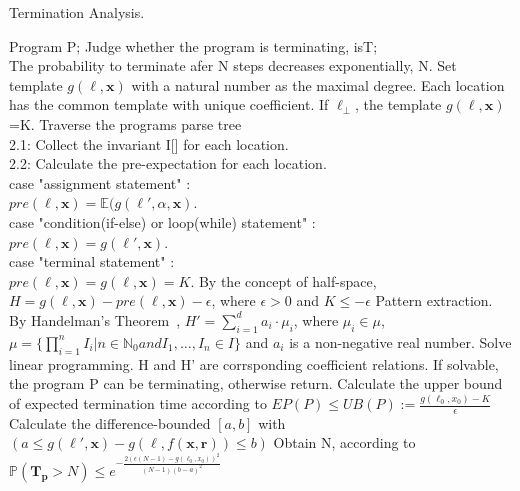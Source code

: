 \documentclass[sigconf,review, anonymous]{acmart}
\begin{document}
\begin{algorithm}[htb]  
	\caption{Termination Analysis.}  
	\label{TA}  
	\begin{algorithmic}[1]  
		\REQUIRE 
		Program P; 
		\ENSURE  
		Judge whether the program is terminating, isT;\\
		The probability to terminate afer N steps decreases exponentially, N.
		\STATE Set template $g(\ell,\boldsymbol{x})$ with a natural number as the maximal degree. Each location has the common template with unique coefficient. If $\ell_{\bot}$, the template $g(\ell,\boldsymbol{x})$=K.
		\STATE Traverse the programs parse tree \\
		2.1: Collect the invariant I[] for each location.\\
		2.2: Calculate the pre-expectation for each location.\\
		\quad \quad case "assignment statement" :\\
		\quad \quad \quad \quad $pre(\ell,\boldsymbol{x})= \mathbb{E}(g(\ell',\alpha,\boldsymbol{x})$.\\
		\quad \quad case "condition(if-else) or loop(while) statement" :\\
		\quad \quad \quad \quad $pre(\ell,\boldsymbol{x})=g(\ell',\boldsymbol{x})$.\\
		\quad \quad case "terminal statement" :\\
		\quad \quad \quad \quad $pre(\ell,\boldsymbol{x})=g(\ell,\boldsymbol{x})=K$.
		\STATE By the concept of half-space, $H=g(\ell,\boldsymbol{x})-pre(\ell,\boldsymbol{x})-\epsilon$, where $\epsilon >0$ and $K \leq -\epsilon$
		\STATE Pattern extraction. By Handelman's Theorem~\cite{Handelman1988Representing}, $H'=\sum\limits_{i=1}^{d} a_i\cdot \mu_i$, where $\mu_i \in \mu$, $\mu=\{\prod\limits_{i=1}^{n} I_i | n\in\mathbb{N}_0 and I_1,\dots,I_n \in I\}$ and $a_i$ is a non-negative real number.
		\STATE Solve linear programming. H and H' are corrsponding coefficient relations. If solvable, the program P can be terminating, otherwise return.
		\STATE Calculate the upper bound of expected termination time according to $EP(P)\leq UB(P):=\frac{g(\ell_0,x_0)-K}{\epsilon}$
		\STATE Calculate the difference-bounded $[a,b]$ with $(a\leq g(\ell',\boldsymbol{x})-g(\ell,f(\boldsymbol{x},\boldsymbol{r}))\leq b)$
		\STATE Obtain N, according to $\mathbb{P}(\bm{T_p} > N) \leq e^{-\frac{2(\epsilon(N-1)-g(\ell_0,x_0))^2}{(N-1)(b-a)^2}}$
	\end{algorithmic}  
\end{algorithm}  
\end{document}
